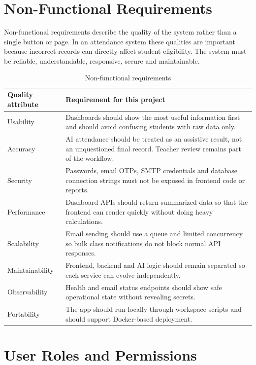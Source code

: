 \section{Non-Functional Requirements}

Non-functional requirements describe the quality of the system rather than a single button or page. In an attendance system these qualities are important because incorrect records can directly affect student eligibility. The system must be reliable, understandable, responsive, secure and maintainable.

\begin{table}[H]
\centering
\caption{Non-functional requirements}
\label{tab:nonfunctional}
\begin{tabularx}{\textwidth}{p{3.5cm} X}
\toprule
\textbf{Quality attribute} & \textbf{Requirement for this project}\\
\midrule
Usability & Dashboards should show the most useful information first and should avoid confusing students with raw data only.\\
Accuracy & AI attendance should be treated as an assistive result, not an unquestioned final record. Teacher review remains part of the workflow.\\
Security & Passwords, email OTPs, SMTP credentials and database connection strings must not be exposed in frontend code or reports.\\
Performance & Dashboard APIs should return summarized data so that the frontend can render quickly without doing heavy calculations.\\
Scalability & Email sending should use a queue and limited concurrency so bulk class notifications do not block normal API responses.\\
Maintainability & Frontend, backend and AI logic should remain separated so each service can evolve independently.\\
Observability & Health and email status endpoints should show safe operational state without revealing secrets.\\
Portability & The app should run locally through workspace scripts and should support Docker-based deployment.\\
\bottomrule
\end{tabularx}
\end{table}

\section{User Roles and Permissions}

